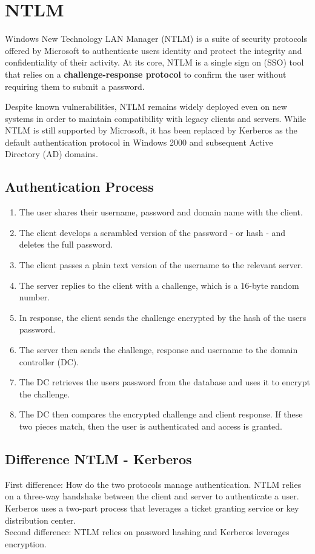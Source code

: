 \section{NTLM}
Windows New Technology LAN Manager (NTLM) is a suite of security protocols offered by Microsoft to authenticate users identity and protect the integrity and confidentiality of their activity. At its core, NTLM is a single sign on (SSO) tool that relies on a \textbf{challenge-response protocol} to confirm the user without requiring them to submit a password.

Despite known vulnerabilities, NTLM remains widely deployed even on new systems in order to maintain compatibility with legacy clients and servers. While NTLM is still supported by Microsoft, it has been replaced by Kerberos as the default authentication protocol in Windows 2000 and subsequent Active Directory (AD) domains.

\subsection{Authentication Process}
\begin{enumerate}
  \item The user shares their username, password and domain name with the client.
  \item The client develops a scrambled version of the password - or hash - and deletes the full password.
  \item The client passes a plain text version of the username to the relevant server.
  \item The server replies to the client with a challenge, which is a 16-byte random number.
  \item In response, the client sends the challenge encrypted by the hash of the users password.
  \item The server then sends the challenge, response and username to the domain controller (DC).
  \item The DC retrieves the users password from the database and uses it to encrypt the challenge.
  \item The DC then compares the encrypted challenge and client response. If these two pieces match, then the user is authenticated and access is granted.

\end{enumerate}

\subsection{Difference NTLM - Kerberos}
First difference: How do the two protocols manage authentication. NTLM relies on a three-way handshake between the client and server to authenticate a user. Kerberos uses a two-part process that leverages a ticket granting service or key distribution center.\\

Second difference: NTLM relies on password hashing and Kerberos leverages encryption.

